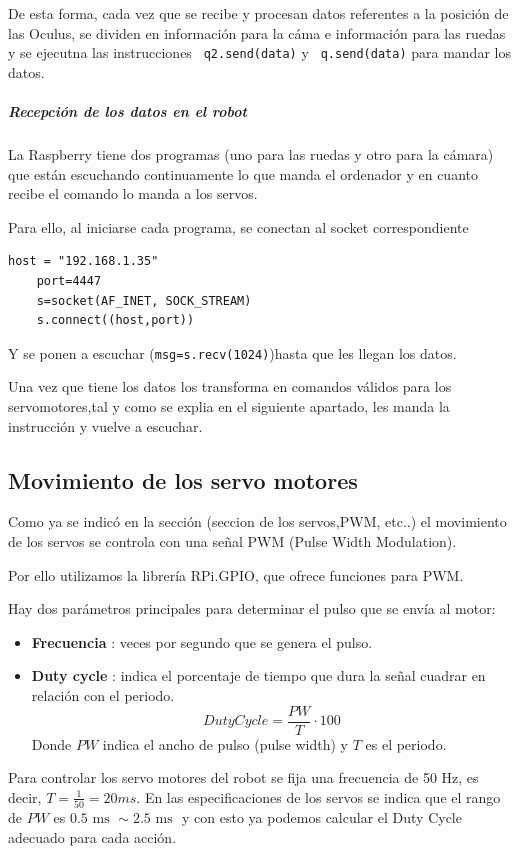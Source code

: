 \documentclass[twoside, 12pt]{epstfg}
\begin{document}
De esta forma, cada vez que se recibe y procesan datos referentes a la posición de las Oculus, se dividen en información para la cáma e información para las ruedas y se ejecutna las instrucciones \texttt{ q2.send(data)}  y \texttt{ q.send(data)} para mandar los datos.
\subparagraph{Recepción de los datos en el robot}

La Raspberry tiene dos programas (uno para las ruedas y otro para la
cámara) que están escuchando continuamente lo que manda el ordenador y en
cuanto recibe el comando lo manda a los servos.

Para ello, al iniciarse cada programa, se conectan al socket correspondiente
\lstset{language=python, breaklines=true, basicstyle=\footnotesize}
\begin{lstlisting}[frame=single]
	host = "192.168.1.35"
	port=4447
	s=socket(AF_INET, SOCK_STREAM)
	s.connect((host,port))
\end{lstlisting}

Y se ponen a escuchar (\texttt{msg=s.recv(1024)})hasta que les llegan los datos.

Una vez que tiene los datos los transforma en comandos válidos para los servomotores,tal y como se explia en el siguiente apartado, les manda la instrucción y vuelve a escuchar.


\subsection{Movimiento de los servo motores}


Como ya se indicó en la sección (seccion de los servos,PWM, etc..) el movimiento de los servos se controla con una señal PWM (Pulse Width Modulation).

Por ello utilizamos la librería RPi.GPIO, que ofrece funciones para PWM.

Hay dos parámetros principales para determinar el pulso que se envía al motor:
\begin{itemize}
	\item \textbf{Frecuencia} : veces por segundo que se genera el pulso.
	\item \textbf{Duty cycle} : indica el porcentaje de tiempo que dura la señal cuadrar en relación con el periodo.
	$$DutyCycle = \frac{PW}{T}\cdot 100$$
	Donde $PW$ indica el ancho de pulso (pulse width) y $T$ es el periodo.
	
\end{itemize}

Para controlar los servo motores del robot se fija una frecuencia de 50 Hz, es decir, $T = \frac{1}{50} = 20 ms$.
En las especificaciones de los servos se indica que el rango de $PW$ es $0.5 \text{ ms } \sim 2.5\text{ ms }$ y con esto ya podemos calcular el Duty Cycle adecuado para cada acción.
\end{document}
